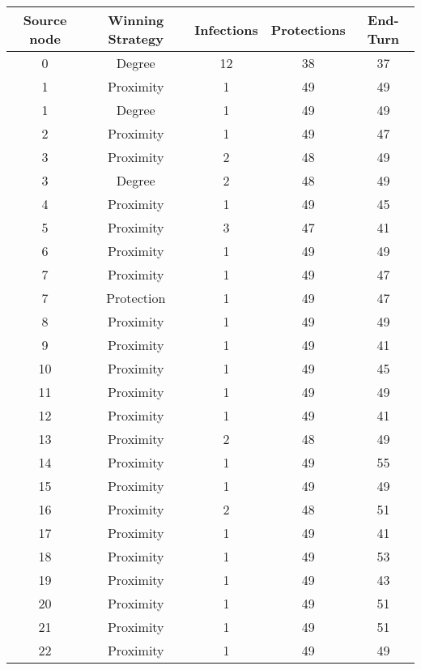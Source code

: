 \documentclass[results.tex]{subfiles}
\begin{document}
\begin{center}
  \begin{tabular}{| c || c | c | c | c |}
    \hline
    {\bfseries Source node} & {\bfseries Winning Strategy} & {\bfseries Infections} & {\bfseries Protections} & {\bfseries End-Turn} \\  %
    \hline\hline
    0 & Degree & 12 & 38 & 37 \\ 
    \hline
    1 & Proximity & 1 & 49 & 49 \\ 
    \hline
    1 & Degree & 1 & 49 & 49 \\ 
    \hline
    2 & Proximity & 1 & 49 & 47 \\ 
    \hline
    3 & Proximity & 2 & 48 & 49 \\ 
    \hline
    3 & Degree & 2 & 48 & 49 \\ 
    \hline
    4 & Proximity & 1 & 49 & 45 \\ 
    \hline
    5 & Proximity & 3 & 47 & 41 \\ 
    \hline
    6 & Proximity & 1 & 49 & 49 \\ 
    \hline
    7 & Proximity & 1 & 49 & 47 \\ 
    \hline
    7 & Protection & 1 & 49 & 47 \\ 
    \hline
    8 & Proximity & 1 & 49 & 49 \\ 
    \hline
    9 & Proximity & 1 & 49 & 41 \\ 
    \hline
    10 & Proximity & 1 & 49 & 45 \\ 
    \hline
    11 & Proximity & 1 & 49 & 49 \\ 
    \hline
    12 & Proximity & 1 & 49 & 41 \\ 
    \hline
    13 & Proximity & 2 & 48 & 49 \\ 
    \hline
    14 & Proximity & 1 & 49 & 55 \\ 
    \hline
    15 & Proximity & 1 & 49 & 49 \\ 
    \hline
    16 & Proximity & 2 & 48 & 51 \\ 
    \hline
    17 & Proximity & 1 & 49 & 41 \\ 
    \hline
    18 & Proximity & 1 & 49 & 53 \\ 
    \hline
    19 & Proximity & 1 & 49 & 43 \\ 
    \hline
    20 & Proximity & 1 & 49 & 51 \\ 
    \hline
    21 & Proximity & 1 & 49 & 51 \\ 
    \hline
    22 & Proximity & 1 & 49 & 49 \\ 

\end{tabular}
\end{center}
\end{document}
